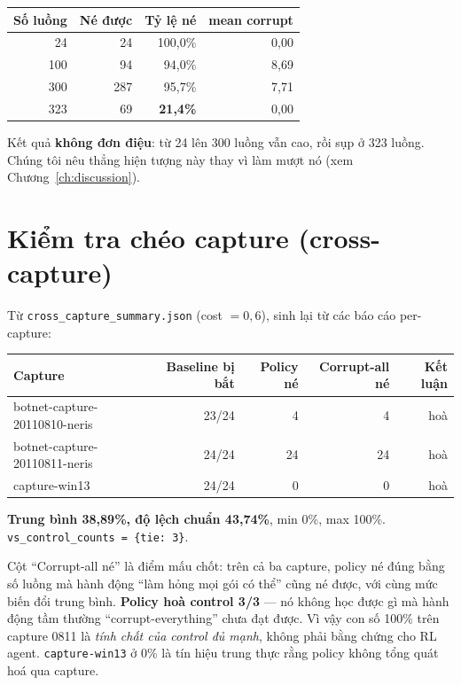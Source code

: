 \documentclass[12pt,a4paper]{report}
\begin{document}
\begin{center}
\begin{tabular}{rrrr}
\toprule
Số luồng & Né được & Tỷ lệ né & mean corrupt \\
\midrule
24  & 24  & 100{,}0\% & 0{,}00 \\
100 & 94  & 94{,}0\%  & 8{,}69 \\
300 & 287 & 95{,}7\%  & 7{,}71 \\
323 & 69  & \textbf{21{,}4\%}  & 0{,}00 \\
\bottomrule
\end{tabular}
\end{center}

Kết quả \textbf{không đơn điệu}: từ 24 lên 300 luồng vẫn cao, rồi sụp ở 323 luồng.
Chúng tôi nêu thẳng hiện tượng này thay vì làm mượt nó (xem Chương~\ref{ch:discussion}).

\section{Kiểm tra chéo capture (cross-capture)}

Từ \texttt{cross\_capture\_summary.json} (cost $=0{,}6$), sinh lại từ các báo cáo
per-capture:

\begin{center}
\begin{tabular}{lrrrr}
\toprule
Capture & Baseline bị bắt & Policy né & Corrupt-all né & Kết luận \\
\midrule
botnet-capture-20110810-neris & 23/24 & 4  & 4  & hoà \\
botnet-capture-20110811-neris & 24/24 & 24 & 24 & hoà \\
capture-win13                 & 24/24 & 0  & 0  & hoà \\
\bottomrule
\end{tabular}
\end{center}

\textbf{Trung bình 38{,}89\%, độ lệch chuẩn 43{,}74\%}, min 0\%, max 100\%.
\texttt{vs\_control\_counts = \{tie: 3\}}.

Cột ``Corrupt-all né'' là điểm mấu chốt: trên cả ba capture, policy né đúng bằng số
luồng mà hành động ``làm hỏng mọi gói có thể'' cũng né được, với cùng mức biến đổi
trung bình. \textbf{Policy hoà control 3/3} — nó không học được gì mà hành động tầm
thường ``corrupt-everything'' chưa đạt được. Vì vậy con số 100\% trên capture 0811 là
\emph{tính chất của control đủ mạnh}, không phải bằng chứng cho RL agent.
\texttt{capture-win13} ở 0\% là tín hiệu trung thực rằng policy không tổng quát hoá
qua capture.
\end{document}
